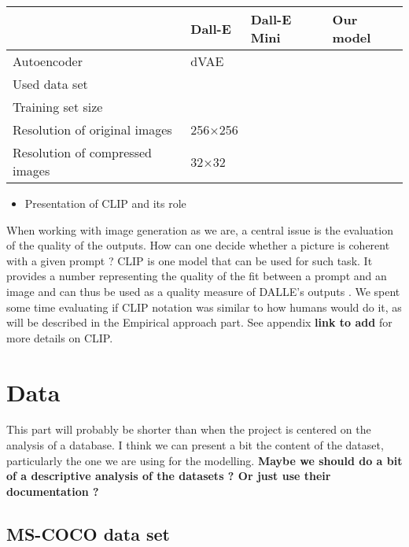 \documentclass{article}
\begin{document}
\begin{table}[h!]
    \centering
    \begin{tabular}{|l|l|l|l|}
    \hline
        ~ & Dall-E & Dall-E Mini& Our model \\ \hline
        Autoencoder & dVAE & ~ & ~ \\ \hline
        Used data set & ~ & ~ & ~ \\ \hline
        Training set size & ~ & ~ & ~ \\ \hline
        Resolution of original images & 256×256 & ~  & ~ \\ \hline
        Resolution of compressed images & 32×32 & ~ & ~ \\ \hline
    \end{tabular}
\end{table}

\begin{itemize}
    \item Presentation of CLIP and its role
\end{itemize}

When working with image generation as we are, a central issue is the evaluation of the quality of the outputs. How can one decide whether a picture is coherent with a given prompt ? CLIP is one model that can be used for such task. It provides a number representing the quality of the fit between a prompt and an image and can thus be used as a quality measure of DALLE's outputs \citet{learntransf, openaiclip}. We spent some time evaluating if CLIP notation was similar to how humans would do it, as will be described in the Empirical approach part. See appendix \textbf{link to add} for more details on CLIP. 



\pagebreak
\section{Data}

This part will probably be shorter than when the project is centered on the analysis of a database. I think we can present a bit the content of the dataset, particularly the one we are using for the modelling.
\textbf{Maybe we should do a bit of a descriptive analysis of the datasets ? Or just use their documentation ?}

\subsection{MS-COCO data set}
\end{document}
